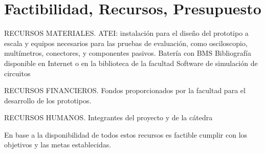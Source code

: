 \section*{Factibilidad, Recursos, Presupuesto}
RECURSOS MATERIALES.
ATEI: instalación para el diseño del prototipo a escala y equipos necesarios para las pruebas de evaluación, como osciloscopio, multímetros, conectores, y componentes pasivos. 
Batería con BMS 
Bibliografía disponible en Internet o en la biblioteca de la facultad
Software de simulación de circuitos

RECURSOS FINANCIEROS.
Fondos proporcionados por la facultad para el desarrollo de los prototipos.

RECURSOS HUMANOS.
Integrantes del proyecto y de la cátedra

En base a la disponibilidad de todos estos recursos es factible cumplir con los objetivos y las metas establecidas. 